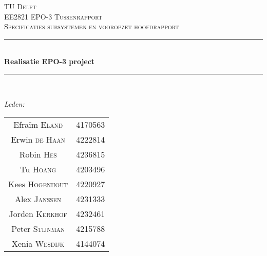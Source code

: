 \documentclass[12pt]{scrreprt}
\begin{document}
\begin{titlepage}

\newcommand{\HRule}{\rule{\linewidth}{0.5mm}} %

\center %
 

\textsc{\LARGE TU Delft}\\[1.5cm] %
\textsc{\Large EE2821 EPO-3 Tussenrapport}\\[0.5cm] %
\textsc{\large Specificaties subsystemen en vooropzet hoofdrapport}\\[0.5cm] %


\HRule \\[0.4cm]
{ \huge \bfseries Realisatie EPO-3 project}\\[0.2cm] %
\HRule \\[1.5cm]
 

\begin{minipage}{0.4\textwidth}
\begin{flushleft} \large
\emph{Leden:}\\
\begin{tabular}{cc}
Efraïm\textsc{ Eland} & 4170563 \\
Erwin \textsc{de Haan} & 4222814\\
Robin \textsc{Hes}& 4236815\\
Tu \textsc{Hoang} &4203496 \\
Kees \textsc{Hogenhout} & 4220927\\
Alex \textsc{Janssen} &	4231333\\
Jorden \textsc{ Kerkhof} & 4232461\\
Peter \textsc{Stijnman} & 4215788 \\
Xenia \textsc{Wesdijk} & 4144074\\
\end{tabular}


\end{flushleft}
\end{minipage}
\end{titlepage}
\end{document}
